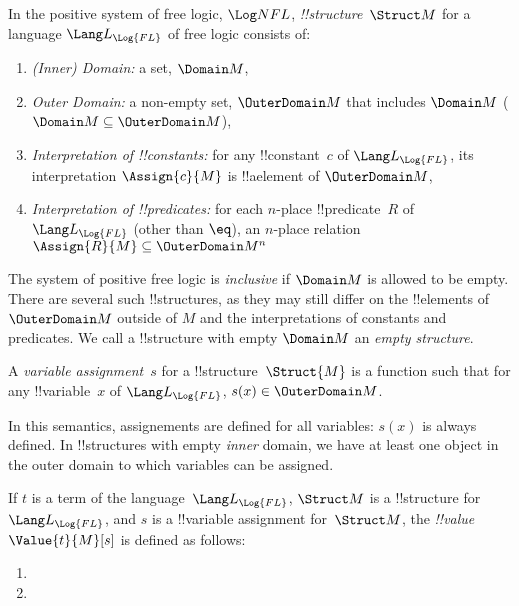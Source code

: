 \documentclass[../../../../include/open-logic-section]{subfiles}
\begin{document}
\begin{defn}[!!^{structure}s]
    In the positive system of free logic, $\Log NFL$,
     \emph{!!{structure}}~$\Struct M$ for a language
    $\Lang L_{\Log{FL}}$ of free logic consists of:
    \begin{enumerate}
    \item \emph{(Inner) Domain:} a set, $\Domain M$,
    \item \emph{Outer Domain:} a non-empty set, $\OuterDomain M$ that
        includes $\Domain M$ ($\Domain M \subseteq \OuterDomain M $),
    \item \emph{Interpretation of !!{constant}s:} for any !!{constant}~$c$ of
      $\Lang L_{\Log{FL}}$, its interpretation $\Assign{c}{M}$ is !!a{element} of 
      $\OuterDomain M$,
    \item \emph{Interpretation of !!{predicate}s:} for each $n$-place
      !!{predicate}~$R$ of $\Lang L_{\Log{FL}}$ (other than $\eq$), an $n$-place
      relation $\Assign{R}{M} \subseteq \OuterDomain M^n$
    \end{enumerate}
    The system of positive free logic is \emph{inclusive} if $\Domain M$ is
    allowed to be empty. There are several such !!{structure}s, as they may
    still differ on the !!{element}s of $\OuterDomain M$ outside of $M$ and the 
    interpretations of constants and predicates. We call a !!{structure} with
    empty $\Domain M$ an \emph{empty structure}. 
\end{defn}
    
\begin{defn}
  A \emph{variable assignment}~$s$ for a !!{structure}~$\Struct{M}$ is a
    function such that for any !!{variable}~$x$ of
    $\Lang L_{\Log{FL}}$, $s(x) \in \OuterDomain M$. 
\end{defn}

In this semantics, assignements are defined for all variables: 
$s(x)$ is always defined. In !!{structure}s with empty \emph{inner}
domain, we have at least one object in the outer domain to which 
variables can be assigned. 

\begin{defn}
  If $t$ is a term of the language~$\Lang L_{\Log{FL}}$, $\Struct M$ is a
  !!{structure} for~$\Lang L_{\Log{FL}}$, and $s$ is a !!{variable} assignment
  for~$\Struct M$, the \emph{!!{value}}~$\Value{t}{M}[s]$ is defined as
  follows:
  \begin{enumerate}
  \item {}
  \item {}
  \end{enumerate}
\end{defn}
      
\end{document}
